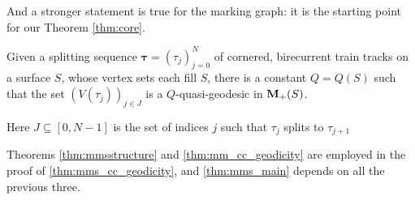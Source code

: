 And a stronger statement is true for the marking graph: it is the starting point for our Theorem \ref{thm:core}.
\begin{theo}\label{thm:mms_main}
Given a splitting sequence $\bm\tau=(\tau_j)_{j=0}^N$ of cornered, birecurrent train tracks on a surface $S$, whose vertex sets each fill $S$, there is a constant $Q=Q(S)$ such that the set $\left(V(\tau_j)\right)_{j\in J}$ is a $Q$-quasi-geodesic in ${\mathbf{M}_+}(S)$.

Here $J\subseteq [0,N-1]$ is the set of indices $j$ such that $\tau_j$ splits to $\tau_{j+1}$
\end{theo}

Theorems \ref{thm:mmsstructure} and \ref{thm:mm_cc_geodicity} are employed in the proof of \ref{thm:mms_cc_geodicity}, and \ref{thm:mms_main} depends on all the previous three.